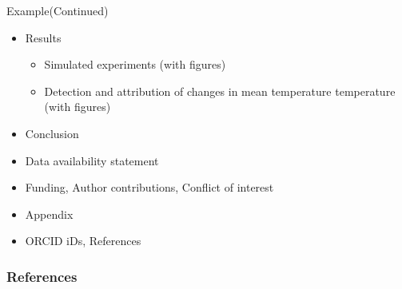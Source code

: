 \documentclass{beamer}
\begin{document}
    
    \begin{frame}{Example(Continued)}
    \begin{itemize}
        \item Results
        \begin{itemize}
            \item Simulated experiments (with figures)
            \item Detection and attribution of changes in mean temperature
    temperature (with figures)
        \end{itemize}
        \item Conclusion
        \item Data availability statement
        \item Funding, Author contributions, Conflict of interest
        \item Appendix
        \item ORCID iDs, References
    \end{itemize} 
    \end{frame}


\begin{frame}
  \frametitle{References}
  \printbibliography
\end{frame}
\end{document}
